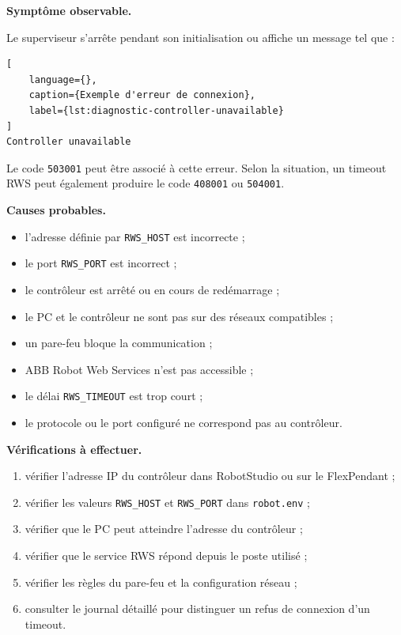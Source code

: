 \documentclass{rapportENSAM}
\begin{document}
\textbf{Symptôme observable.}

Le superviseur s'arrête pendant son initialisation ou affiche un message tel
que :

\begin{lstlisting}[
    language={},
    caption={Exemple d'erreur de connexion},
    label={lst:diagnostic-controller-unavailable}
]
Controller unavailable
\end{lstlisting}

Le code \texttt{503001} peut être associé à cette erreur. Selon la situation,
un timeout RWS peut également produire le code \texttt{408001} ou
\texttt{504001}.

\textbf{Causes probables.}

\begin{itemize}
    \item l'adresse définie par \texttt{RWS\_HOST} est incorrecte ;
    \item le port \texttt{RWS\_PORT} est incorrect ;
    \item le contrôleur est arrêté ou en cours de redémarrage ;
    \item le PC et le contrôleur ne sont pas sur des réseaux compatibles ;
    \item un pare-feu bloque la communication ;
    \item ABB Robot Web Services n'est pas accessible ;
    \item le délai \texttt{RWS\_TIMEOUT} est trop court ;
    \item le protocole ou le port configuré ne correspond pas au contrôleur.
\end{itemize}

\textbf{Vérifications à effectuer.}

\begin{enumerate}
    \item vérifier l'adresse IP du contrôleur dans RobotStudio ou sur le
    FlexPendant ;
    \item vérifier les valeurs \texttt{RWS\_HOST} et \texttt{RWS\_PORT} dans
    \texttt{robot.env} ;
    \item vérifier que le PC peut atteindre l'adresse du contrôleur ;
    \item vérifier que le service RWS répond depuis le poste utilisé ;
    \item vérifier les règles du pare-feu et la configuration réseau ;
    \item consulter le journal détaillé pour distinguer un refus de connexion
    d'un timeout.
\end{enumerate}
\end{document}
